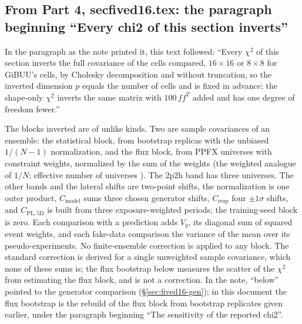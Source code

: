 \subsection{From Part 4, secfived16.tex: the paragraph beginning ``Every chi2 of this section inverts''}
In the paragraph as the note printed it, this text followed: ``Every $\chi^2$ of this section inverts the full covariance of the cells compared, $16\times16$ or $8\times8$ for GiBUU's cells, by Cholesky decomposition and without truncation, so the inverted dimension $p$ equals the number of cells and is fixed in advance; the shape-only $\chi^2$ inverts the same matrix with $100\,f f^{T}$ added and has one degree of freedom fewer.''\par
The blocks inverted are of unlike kinds. Two are sample covariances of an ensemble: the statistical block, from  bootstrap replicas with the unbiased $1/(N-1)$ normalization, and the flux block, from  PPFX universes with constraint weights, normalized by the sum of the weights (the weighted analogue of $1/N$; effective number of universes ). The 2p2h band has three universes. The other bands and the lateral shifts are two-point shifts, the normalization is one outer product, $C_{\mathrm{model}}$ sums three chosen generator shifts, $C_{\mathrm{resp}}$ four $\pm1\sigma$ shifts, and $C_{\mathrm{PL,5D}}$ is built from three exposure-weighted periods; the training-seed block is zero. Each comparison with a prediction adds $V_g$, its diagonal sum of squared event weights, and each fake-data comparison the variance of the mean over its pseudo-experiments. No finite-ensemble correction is applied to any block. The standard correction is derived for a single unweighted sample covariance, which none of these sums is; the flux bootstrap below measures the scatter of the $\chi^2$ from estimating the flux block, and is not a correction.
In the note, ``below'' pointed to the generator comparison (\S\ref{sec:fived16-gen}); in this document the flux bootstrap is the rebuild of the flux block from bootstrap replicates given earlier, under the paragraph beginning ``The sensitivity of the reported chi2''.\par

